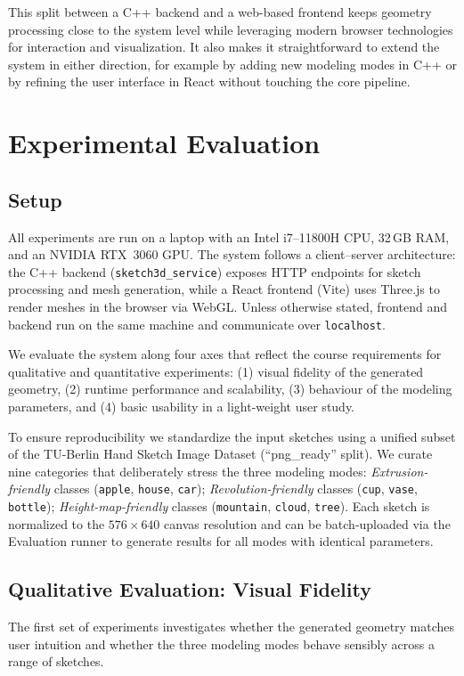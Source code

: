 \documentclass[11pt, a4paper]{article}
\begin{document}
This split between a C++ backend and a web-based frontend keeps geometry processing close to the system level while leveraging modern browser technologies for interaction and visualization. It also makes it straightforward to extend the system in either direction, for example by adding new modeling modes in C++ or by refining the user interface in React without touching the core pipeline.

\section{Experimental Evaluation}
\subsection{Setup}
All experiments are run on a laptop with an Intel i7--11800H CPU, 32\,GB RAM, and an NVIDIA RTX~3060 GPU. The system follows a client--server architecture: the C++ backend (\texttt{sketch3d\_service}) exposes HTTP endpoints for sketch processing and mesh generation, while a React frontend (Vite) uses Three.js to render meshes in the browser via WebGL. Unless otherwise stated, frontend and backend run on the same machine and communicate over \texttt{localhost}.

We evaluate the system along four axes that reflect the course requirements for qualitative and quantitative experiments: (1) visual fidelity of the generated geometry, (2) runtime performance and scalability, (3) behaviour of the modeling parameters, and (4) basic usability in a light-weight user study.

To ensure reproducibility we standardize the input sketches using a unified subset of the TU-Berlin Hand Sketch Image Dataset (``png\_ready'' split). We curate nine categories that deliberately stress the three modeling modes: \emph{Extrusion-friendly} classes (\texttt{apple}, \texttt{house}, \texttt{car}); \emph{Revolution-friendly} classes (\texttt{cup}, \texttt{vase}, \texttt{bottle}); \emph{Height-map-friendly} classes (\texttt{mountain}, \texttt{cloud}, \texttt{tree}). Each sketch is normalized to the $576\times640$ canvas resolution and can be batch-uploaded via the Evaluation runner to generate results for all modes with identical parameters.

\subsection{Qualitative Evaluation: Visual Fidelity}
The first set of experiments investigates whether the generated geometry matches user intuition and whether the three modeling modes behave sensibly across a range of sketches.
\end{document}

